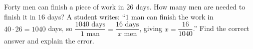 Forty men can finish a piece of work in $26$ days. How many men are needed to finish it in $16$ days? A student writes: ``$1$ man can finish the work in $40\cdot26=1040$ days, so $\dfrac{1040\text{ days}}{1\text{ man}}=\dfrac{16\text{ days}}{x\text{ men}}$, giving $x=\dfrac{16}{1040}$.'' Find the correct answer and explain the error.
